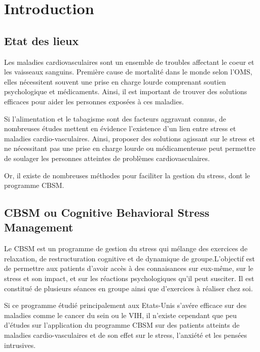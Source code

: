 \documentclass[]{article}
\begin{document}
\newpage

\hypertarget{introduction}{%
\section{Introduction}\label{introduction}}

\hypertarget{etat-des-lieux}{%
\subsection{Etat des lieux}\label{etat-des-lieux}}

Les maladies cardiovasculaires sont un ensemble de troubles affectant le
coeur et les vaisseaux sanguins. Première cause de mortalité dans le
monde selon l'OMS, elles nécessitent souvent une prise en charge lourde
comprenant soutien psychologique et médicaments. Ainsi, il est important
de trouver des solutions efficaces pour aider les personnes exposées à
ces maladies.

Si l'alimentation et le tabagisme sont des facteurs aggravant connus, de
nombreuses études mettent en évidence l'existence d'un lien entre stress
et maladies cardio-vasculaires. Ainsi, proposer des solutions agissant
sur le stress et ne nécessitant pas une prise en charge lourde ou
médicamenteuse peut permettre de soulager les personnes atteintes de
problèmes cardiovasculaires.

Or, il existe de nombreuses méthodes pour faciliter la gestion du
stress, dont le programme CBSM.

\hypertarget{cbsm-ou-cognitive-behavioral-stress-management}{%
\subsection{CBSM ou Cognitive Behavioral Stress
Management}\label{cbsm-ou-cognitive-behavioral-stress-management}}

Le CBSM est un programme de gestion du stress qui mélange des exercices
de relaxation, de restructuration cognitive et de dynamique de
groupe.L'objectif est de permettre aux patients d'avoir accès à des
connaisances sur eux-même, sur le stress et son impact, et sur les
réactions psychologiques qu'il peut susciter. Il est constitué de
plusieurs séances en groupe ainsi que d'exercices à réaliser chez soi.

Si ce programme étudié principalement aux Etats-Unis s'avére efficace
sur des maladies comme le cancer du sein ou le VIH, il n'existe
cependant que peu d'études sur l'application du programme CBSM sur des
patients atteints de maladies cardio-vasculaires et de son effet sur le
stress, l'anxiété et les pensées intrusives.
\end{document}
